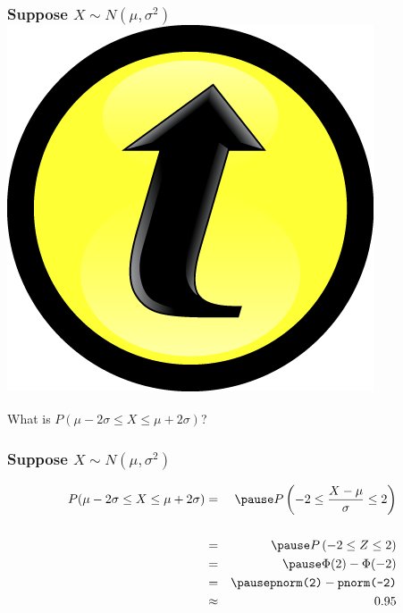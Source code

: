 \documentclass[handout]{beamer}
\begin{document}

\begin{frame}
\frametitle{Suppose $X \sim N(\mu, \sigma^2)$\hfill \includegraphics[scale = 0.05]{./images/clicker}}
What is $P(\mu - 2\sigma \leq X \leq \mu + 2\sigma)$?
\end{frame}

\begin{frame}
\frametitle{Suppose $X \sim N(\mu, \sigma^2)$}

\begin{eqnarray*}
P(\mu - 2\sigma \leq X \leq \mu + 2\sigma) &=&\pause P\left( -2 \leq \frac{X-\mu}{\sigma} \leq 2\right)\\ \\
	&=&\pause P\left( -2 \leq Z \leq 2\right)\\
	&=&\pause \Phi(2) - \Phi(-2)\\
	&=&\pause \mbox{\texttt{pnorm(2)}} -  \mbox{\texttt{pnorm(-2)}}\\
	&\approx& 0.95
\end{eqnarray*}
\end{frame}


\end{document}
